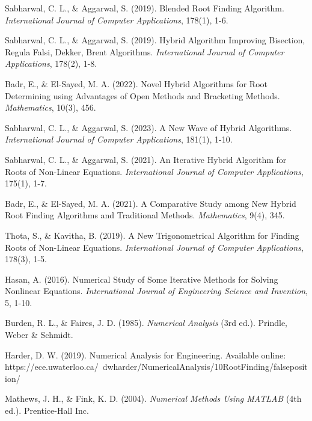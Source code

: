 \documentclass[amsmath, amssymb, aps]{revtex4-2}
\begin{document}
\begin{thebibliography}{99}

Sabharwal, C. L., \& Aggarwal, S. (2019). Blended Root Finding Algorithm. \textit{International Journal of Computer Applications}, 178(1), 1-6.

Sabharwal, C. L., \& Aggarwal, S. (2019). Hybrid Algorithm Improving Bisection, Regula Falsi, Dekker, Brent Algorithms. \textit{International Journal of Computer Applications}, 178(2), 1-8.

Badr, E., \& El-Sayed, M. A. (2022). Novel Hybrid Algorithms for Root Determining using Advantages of Open Methods and Bracketing Methods. \textit{Mathematics}, 10(3), 456.

Sabharwal, C. L., \& Aggarwal, S. (2023). A New Wave of Hybrid Algorithms. \textit{International Journal of Computer Applications}, 181(1), 1-10.

Sabharwal, C. L., \& Aggarwal, S. (2021). An Iterative Hybrid Algorithm for Roots of Non-Linear Equations. \textit{International Journal of Computer Applications}, 175(1), 1-7.

Badr, E., \& El-Sayed, M. A. (2021). A Comparative Study among New Hybrid Root Finding Algorithms and Traditional Methods. \textit{Mathematics}, 9(4), 345.

Thota, S., \& Kavitha, B. (2019). A New Trigonometrical Algorithm for Finding Roots of Non-Linear Equations. \textit{International Journal of Computer Applications}, 178(3), 1-5.

Hasan, A. (2016). Numerical Study of Some Iterative Methods for Solving Nonlinear Equations. \textit{International Journal of Engineering Science and Invention}, 5, 1-10.

Burden, R. L., \& Faires, J. D. (1985). \textit{Numerical Analysis} (3rd ed.). Prindle, Weber \& Schmidt.

Harder, D. W. (2019). Numerical Analysis for Engineering. Available online: https://ece.uwaterloo.ca/~dwharder/NumericalAnalysis/10RootFinding/falseposition/

Mathews, J. H., \& Fink, K. D. (2004). \textit{Numerical Methods Using MATLAB} (4th ed.). Prentice-Hall Inc.


\end{thebibliography}
\end{document}
